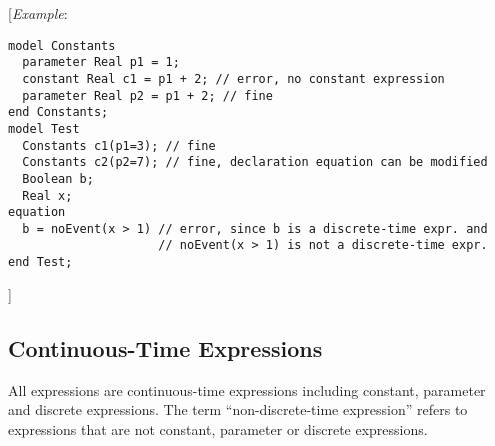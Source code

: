 {[}\emph{Example}:
\begin{lstlisting}[language=modelica]
model Constants
  parameter Real p1 = 1;
  constant Real c1 = p1 + 2; // error, no constant expression
  parameter Real p2 = p1 + 2; // fine
end Constants;
model Test
  Constants c1(p1=3); // fine
  Constants c2(p2=7); // fine, declaration equation can be modified
  Boolean b;
  Real x;
equation
  b = noEvent(x > 1) // error, since b is a discrete-time expr. and
                     // noEvent(x > 1) is not a discrete-time expr.
end Test;
\end{lstlisting}

{]}

\subsection{Continuous-Time Expressions}

All expressions are continuous-time expressions including constant,
parameter and discrete expressions. The term ``non-discrete-time
expression'' refers to expressions that are not constant, parameter or
discrete expressions.
